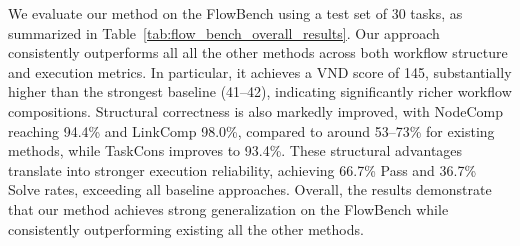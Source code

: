 \documentclass[runningheads]{llncs}
\begin{document}
We evaluate our method on the FlowBench\cite{huang2025comfygpt} using a test set of 30 tasks, as summarized in Table~\ref{tab:flow_bench_overall_results}. 
Our approach consistently outperforms all all the other methods across both workflow structure and execution metrics. 
In particular, it achieves a VND score of 145, substantially higher than the strongest baseline (41–42), indicating significantly richer workflow compositions. 
Structural correctness is also markedly improved, with NodeComp reaching 94.4\% and LinkComp 98.0\%, compared to around 53–73\% for existing methods, while TaskCons improves to 93.4\%. 
These structural advantages translate into stronger execution reliability, achieving 66.7\% Pass and 36.7\% Solve rates, exceeding all baseline approaches. Overall, the results demonstrate that our method achieves strong generalization on the  FlowBench\cite{huang2025comfygpt} while consistently outperforming existing all the other methods.



\end{document}
